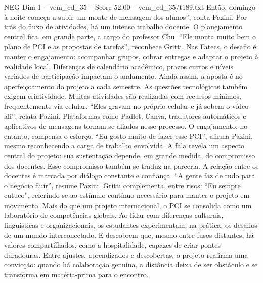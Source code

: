 \begin{textsample}{NEG Dim 1 – vem\_ed\_35 – Score 52.00 – vem\_ed\_35/t189.txt}
Então, domingo à noite começa a subir um monte de mensagem dos alunos”, conta Pazini.
Por trás do fluxo de atividades, há um intenso trabalho docente.
O planejamento central fica, em grande parte, a cargo do professor Chu. “Ele monta muito bem o plano de PCI e as propostas de tarefas”, reconhece Gritti.
Nas Fatecs, o desafio é manter o engajamento: acompanhar grupos, cobrar entregas e adaptar o projeto à realidade local.
Diferenças de calendário acadêmico, prazos curtos e níveis variados de participação impactam o andamento.
Ainda assim, a aposta é no aperfeiçoamento do projeto a cada semestre.
As questões tecnológicas também exigem criatividade.
Muitas atividades são realizadas com recursos mínimos, frequentemente via celular. “Eles gravam no próprio celular e já sobem o vídeo ali”, relata Pazini.
Plataformas como Padlet, Canva, tradutores automáticos e aplicativos de mensagens tornam-se aliados nesse processo.
O engajamento, no entanto, compensa o esforço. “Eu gosto muito de fazer esse PCI”, afirma Pazini, mesmo reconhecendo a carga de trabalho envolvida.
A fala revela um aspecto central do projeto: sua sustentação depende, em grande medida, do compromisso dos docentes.
Esse compromisso também se traduz na parceria.
A relação entre os docentes é marcada por diálogo constante e confiança. “A gente faz de tudo para o negócio fluir”, resume Pazini.
Gritti complementa, entre risos: “Eu sempre cutuco”, referindo-se ao estímulo contínuo necessário para manter o projeto em movimento.
Mais do que um projeto internacional, o PCI se consolida como um laboratório de competências globais.
Ao lidar com diferenças culturais, linguísticas e organizacionais, os estudantes experimentam, na prática, os desafios de um mundo interconectado.
E descobrem que, mesmo entre fusos distantes, há valores compartilhados, como a hospitalidade, capazes de criar pontes duradouras.
Entre ajustes, aprendizados e descobertas, o projeto reafirma uma convicção: quando há colaboração genuína, a distância deixa de ser obstáculo e se transforma em matéria-prima para o encontro.

\end{textsample}
